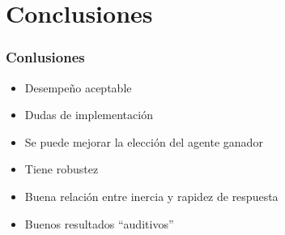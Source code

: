 \documentclass[slidestop,compress,mathserif,xcolor=svgnames,table,xcolor=dvipsnames]{beamer}
\begin{document}
\begin{frame}


\end{frame}

\section{Conclusiones}
\begin{frame}
\frametitle{Conlusiones}
\begin{scriptsize}
\vspace*{30pt}
\begin{itemize}
  \item<1-> \alert<1>{Desempeño aceptable} 
  \vspace*{10pt}
  \item<2-> \alert<2>{Dudas de implementación}
  \vspace*{10pt}
  \item<3-> \alert<3>{Se puede mejorar la elección del agente ganador}
  \vspace*{10pt}
  \item<4-> \alert<4>{Tiene robustez}
  \vspace*{10pt}
  \item<5-> \alert<5>{Buena relación entre inercia y rapidez de respuesta}
  \vspace*{10pt}
  \item<6-> \alert<6>{Buenos resultados ``auditivos''}
\end{itemize}


\end{scriptsize}

\end{frame}
\end{document}
